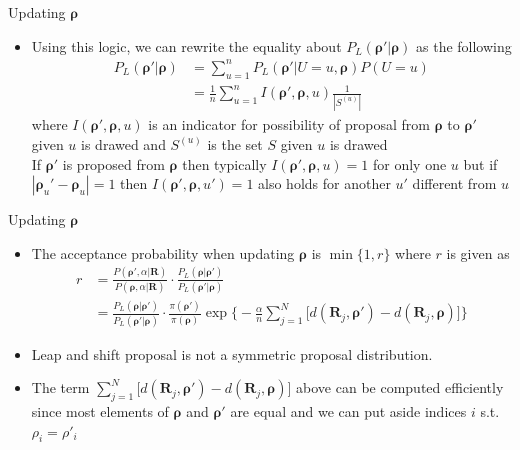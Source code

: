 \documentclass[11pt]{beamer}
\begin{document}
\begin{frame}{Updating $\boldsymbol{\rho}$}
\begin{itemize}
    \item Using this logic, we can rewrite the equality about $P_L(\boldsymbol{\rho}'|\boldsymbol{\rho})$ as the following 
    \begin{align*}
        P_L(\boldsymbol{\rho}'|\boldsymbol{\rho}) &= \sum_{u=1}^n P_L(\boldsymbol{\rho}'|U=u, \boldsymbol{\rho})P(U=u) \\ &= \frac{1}{n}\sum_{u=1}^n I(\boldsymbol{\rho}', \boldsymbol{\rho}, u) \frac{1}{|S^{(u)}|}
    \end{align*}
    where $I(\boldsymbol{\rho}', \boldsymbol{\rho}, u)$ is an indicator for possibility of proposal from $\boldsymbol{\rho}$ to $\boldsymbol{\rho}'$ given $u$ is drawed and $S^{(u)}$ is the set $S$ given $u$ is drawed \\ If $\boldsymbol{\rho}'$ is proposed from $\boldsymbol{\rho}$ then typically $I(\boldsymbol{\rho}', \boldsymbol{\rho}, u)=1$ for only one $u$ but if $|\boldsymbol{\rho}_u'-\boldsymbol{\rho}_u|=1$ then $I(\boldsymbol{\rho}', \boldsymbol{\rho}, u')=1$ also holds for another $u'$ different from $u$
\end{itemize}
\end{frame}

\begin{frame}{Updating $\boldsymbol{\rho}$}
\begin{itemize}
    \item The acceptance probability when updating $\boldsymbol{\rho}$ is 
        $\min\{1, r\}$ where $r$ is given as 
        \begin{align*}
            r &=\frac{P(\boldsymbol{\rho}', \alpha | \mathbf{R})}{P(\boldsymbol{\rho}, \alpha | \mathbf{R})}\cdot \frac{P_L(\boldsymbol{\rho}|\boldsymbol{\rho}')}{P_L(\boldsymbol{\rho}'|\boldsymbol{\rho})} \\ &= \frac{P_L(\boldsymbol{\rho}|\boldsymbol{\rho}')}{P_L(\boldsymbol{\rho}'|\boldsymbol{\rho})} \cdot \frac{\pi(\boldsymbol{\rho}')}{\pi(\boldsymbol{\rho})}\exp\big\{-\frac{\alpha}{n}\sum_{j=1}^N \big[d(\mathbf{R}_j, \boldsymbol{\rho}')-d(\mathbf{R}_j, \boldsymbol{\rho})\big] \big\}
        \end{align*} 
    \item Leap and shift proposal is not a symmetric proposal distribution. 
    \item The term $\sum_{j=1}^N \big[d(\mathbf{R}_j, \boldsymbol{\rho}')-d(\mathbf{R}_j, \boldsymbol{\rho})\big]$ above can be computed efficiently since most elements of $\boldsymbol{\rho}$ and $\boldsymbol{\rho}'$ are equal and we can put aside indices $i$ s.t. $\rho_i=\rho'_i$
\end{itemize}
\end{frame}
\end{document}
